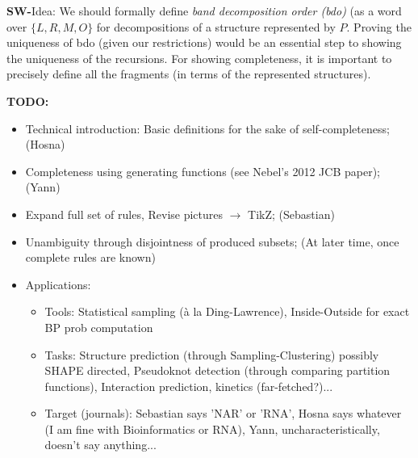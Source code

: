 \documentclass[11pt]{article} %
\newcommand{\SW}[1]{\textbf{SW-}#1}
\begin{document}
\SW{Idea: We should formally define \emph{band decomposition order (bdo)} (as a word over $\{L,R,M,O\}$ for decompositions of a structure
represented by $P$. Proving the uniqueness of bdo (given our restrictions) would be an essential step to showing the uniqueness of the recursions. For showing completeness, it is important to precisely define all the fragments (in terms of the represented structures).}

\newpage
{\bf TODO:}
\begin{itemize}
  \item Technical introduction: Basic definitions for the sake of self-completeness; (Hosna)
  \item Completeness using generating functions (see Nebel's 2012 JCB paper); (Yann)
  \item Expand full set of rules, Revise pictures $\to$ TikZ; (Sebastian)
  \item Unambiguity through disjointness of produced subsets; (At later time, once complete rules are known)
  \item Applications: 
  \begin{itemize}
    \item Tools: Statistical sampling (à la Ding-Lawrence), Inside-Outside for exact BP prob computation
    \item Tasks: Structure prediction (through Sampling-Clustering) possibly SHAPE directed, Pseudoknot detection (through comparing partition functions), Interaction prediction, kinetics (far-fetched?)...
    \item Target (journals): Sebastian says 'NAR' or 'RNA', Hosna says whatever (I am fine with Bioinformatics or RNA), Yann, uncharacteristically, doesn't say anything...
  \end{itemize}
\end{itemize}
\end{document}
